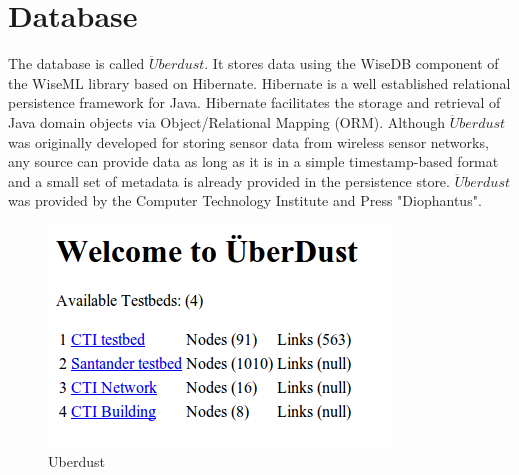\documentclass[12pt,a4paper,draft]{report}
\begin{document}
\section{Database}
The database is called $\ddot{U}berdust$. It stores data using the WiseDB component of the WiseML library based on Hibernate. Hibernate is a well established relational persistence framework for Java. Hibernate facilitates the storage and retrieval of Java domain objects via Object/Relational Mapping (ORM). Although $\ddot{U}berdust$ was originally developed for storing sensor data from wireless sensor networks, any source can provide data as long as it is in a simple timestamp-based format and a small set of metadata is already provided in the persistence store. $\ddot{U}berdust$ was provided by the Computer Technology Institute and Press "Diophantus". \cite{website:database} \\
%
\begin{figure}[H]
\centering
    \includegraphics*[scale=0.4]{Uberdust}
    \caption{$\ddot{U}berdust$}

    \caption{Uberdust}
\end{figure}
\ \\
%
\newpage
%
\end{document}
